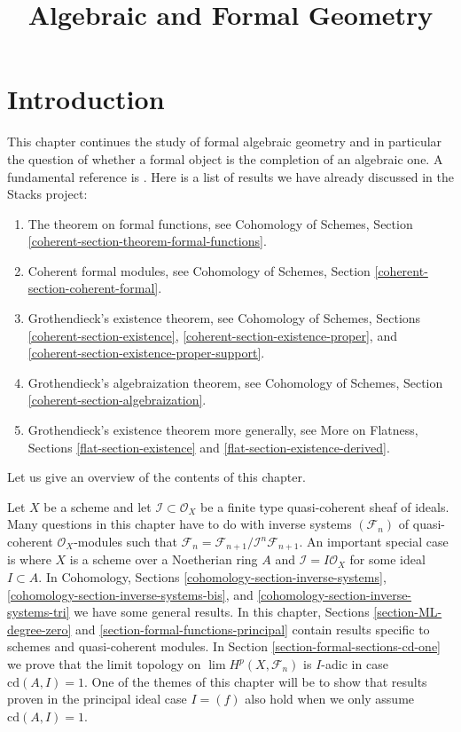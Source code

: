 \documentclass{stacks-project}
\theoremstyle{plain}
\theoremstyle{definition}
\theoremstyle{remark}
\numberwithin{equation}{subsection}
\def\lim{\mathop{\mathrm{lim}}\nolimits}
\begin{document}
\title{Algebraic and Formal Geometry}


\maketitle

\label{section-phantom}

\tableofcontents

\section{Introduction}
\label{section-introduction}

\noindent
This chapter continues the study of formal algebraic geometry
and in particular the question of whether a formal object is
the completion of an algebraic one. A fundamental reference is \cite{SGA2}.
Here is a list of results we have already discussed
in the Stacks project:
\begin{enumerate}
\item The theorem on formal functions, see
Cohomology of Schemes, Section \ref{coherent-section-theorem-formal-functions}.
\item Coherent formal modules, see
Cohomology of Schemes, Section \ref{coherent-section-coherent-formal}.
\item Grothendieck's existence theorem, see
Cohomology of Schemes, Sections \ref{coherent-section-existence},
\ref{coherent-section-existence-proper}, and
\ref{coherent-section-existence-proper-support}.
\item Grothendieck's algebraization theorem, see
Cohomology of Schemes, Section \ref{coherent-section-algebraization}.
\item Grothendieck's existence theorem more generally, see
More on Flatness, Sections \ref{flat-section-existence} and
\ref{flat-section-existence-derived}.
\end{enumerate}
Let us give an overview of the contents of this chapter.

\medskip\noindent
Let $X$ be a scheme and let $\mathcal{I} \subset \mathcal{O}_X$
be a finite type quasi-coherent sheaf of ideals. Many questions
in this chapter have to do with inverse systems $(\mathcal{F}_n)$
of quasi-coherent $\mathcal{O}_X$-modules such that
$\mathcal{F}_n = \mathcal{F}_{n + 1}/\mathcal{I}^n\mathcal{F}_{n + 1}$.
An important special case is where $X$ is a scheme over a Noetherian
ring $A$ and $\mathcal{I} = I \mathcal{O}_X$ for some ideal $I \subset A$.
In Cohomology, Sections \ref{cohomology-section-inverse-systems},
\ref{cohomology-section-inverse-systems-bis}, and
\ref{cohomology-section-inverse-systems-tri} we have some general
results. In this chapter, Sections \ref{section-ML-degree-zero} and
\ref{section-formal-functions-principal} contain results specific
to schemes and quasi-coherent modules. In
Section \ref{section-formal-sections-cd-one} we prove
that the limit topology on $\lim H^p(X, \mathcal{F}_n)$ is $I$-adic
in case $\text{cd}(A, I) = 1$. One of the themes
of this chapter will be to show that results proven in the
principal ideal case $I = (f)$
also hold when we only assume $\text{cd}(A, I) = 1$.
\end{document}
